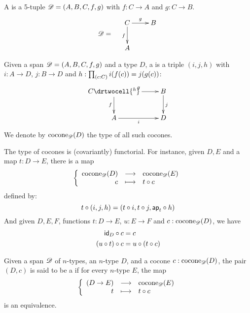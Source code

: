 \begin{defn}
  A  %
  is a 5-tuple $\mathscr{D}=(A,B,C,f,g)$ with %
  $f:C\to{}A$ and $g:C\to{}B$.
  \[\Ddiag=\quad\vcenter{\xymatrix{C \ar^g[r] \ar_f[d] & B \\ A & }}\]
\end{defn}

\begin{defn}
  Given a span $\mathscr{D}=(A,B,C,f,g)$ and a type $D$, a %
   is a triple $(i, j, h)$ with
  $i:A\to{}D$, $j:B\to{}D$ and $h : \prd{c:C}i(f(c))=j(g(c))$:
  \[\uppercurveobject{{ }}\lowercurveobject{{ }}\twocellhead{{ }}
  \xymatrix{C \ar^g[r] \ar_f[d] \drtwocell{^h} & B \ar^j[d] \\ A \ar_i[r] & D
  }\]
  We denote by $\mathrm{cocone}_{\mathscr{D}}(D)$ the type of all such cocones.
\end{defn}

The type of cocones is (covariantly) functorial.
For instance, given $D,E$ %
and a map $t:D\to{}E$, there is a map
  \[\left\{\begin{array}{rcl}\mathrm{cocone}_{\mathscr{D}}(D) & \longrightarrow & \mathrm{cocone}_{\mathscr{D}}(E) \\ c & \longmapsto & t\circ c \end{array}\right.\]
  defined by:
  \[t\circ(i,j,h)=(t\circ{}i,t\circ{}j,\mathsf{ap}_{t}\circ{}h)\]
And given $D,E,F$, %
functions $t:D\to{}E$, $u:E\to{}F$ and $c:\mathrm{cocone}_{\mathscr{D}}(D)$, we have
\begin{align}
  \composecocone{\idfunc[D]}c &= c \label{eq:composeconeid}\\
  \composecocone{(u\circ{}t)}c&=\composecocone{u}(\composecocone{t}c)\label{eq:composeconefunc}
\end{align}

\begin{defn}
  Given a span $\mathscr{D}$ of $n$-types, an $n$-type $D$, and a cocone
  $c:\mathrm{cocone}_{\mathscr{D}}(D)$, the pair $(D,c)$ is said to be a  if for every $n$-type $E$, the map
  \[\left\{\begin{array}{rcl}(D\to{}E) & \longrightarrow & \mathrm{cocone}_{\mathscr{D}}(E) \\ t & \longmapsto & t\circ c \end{array}\right.\]
  is an equivalence.
\end{defn}

